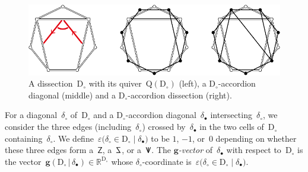 \documentclass{amsart}
\theoremstyle{definition}
\newcommand{\R}{\mathbb{R}} %
\renewcommand{\b}[1]{\mathbf{#1}} %
\newcommand{\bigset}[2]{\big\{ #1 \;\big|\; #2 \big\}} %
\newcommand{\eqdef}{\mbox{\,\raisebox{0.2ex}{\scriptsize\ensuremath{\mathrm:}}\ensuremath{=}\,}} %
\newcommand{\darkblue}{\color{darkblue}} %
\newcommand{\defn}[1]{\textsl{\darkblue #1}} %
\newcommand{\dissection}{\mathrm{D}} %
\newcommand{\sign}[3]{\varepsilon \big( {#1} \in {#2}\;|\;{#3} \big)} %
\newcommand{\SSS}{\reflectbox{$\mathsf{Z}$}} %
\newcommand{\ZZZ}{\mathsf{Z}} %
\newcommand{\VVV}{{\mathsf{{V \hspace{-.1686cm} I\,}}}} %
\newcommand{\gvector}[2]{\mathbf{g}(#1 \,|\, #2)} %
\newcommand{\biggvectors}[2]{\mathbf{g} \big( #1 \,|\, #2 \big)} %
\newcommand{\quiver}{\mathrm{Q}} %
\begin{document}
\begin{figure}
	\capstart
	\centerline{\includegraphics[width=\textwidth]{exmAccordionDissections}}
	\caption{A dissection~$\dissection_\circ$ with its quiver~$\quiver(\dissection_\circ)$ (left), a $\dissection_\circ$-accordion diagonal (middle) and a $\dissection_\circ$-accordion dissection (right).}
	\label{fig:exmAccordionDissections}
\end{figure}



For a diagonal~$\delta_\circ$ of~$\dissection_\circ$ and a $\dissection_\circ$-accordion diagonal~$\delta_\bullet$ intersecting~$\delta_\circ$, we consider the three edges (including~$\delta_\circ$) crossed by~$\delta_\bullet$ in the two cells of~$\dissection_\circ$ containing~$\delta_\circ$. We define~$\sign{\delta_\circ}{\dissection_\circ}{\delta_\bullet}$ to be $1$, $-1$, or~$0$ depending on whether these three edges form a~$\ZZZ$, a~$\SSS$, or a~$\VVV$.
The \defn{$\b{g}$-vector} of~$\delta_\bullet$ with respect to~$\dissection_\circ$ is the vector~$\gvector{\dissection_\circ}{\delta_\bullet} \in \R^{\dissection_\circ}$ whose $\delta_\circ$-coordinate is~$\sign{\delta_\circ}{\dissection_\circ}{\delta_\bullet}$.
\end{document}
